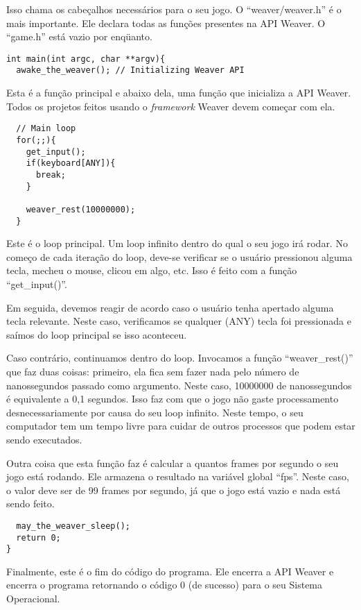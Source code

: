 \documentclass[11pt,a4paper]{book}
\begin{document}
Isso chama os cabeçalhos necessários para o seu
jogo. O ``weaver/weaver.h'' é o mais importante. Ele declara todas as
funções presentes na API Weaver. O ``game.h'' está vazio por enqüanto.  

\begin{verbatim}
int main(int argc, char **argv){
  awake_the_weaver(); // Initializing Weaver API
\end{verbatim}

Esta é a função principal e abaixo dela, uma função que inicializa a
API Weaver. Todos os projetos feitos usando o \textit{framework}
Weaver devem começar com ela.

\begin{verbatim}
  // Main loop
  for(;;){
    get_input();
    if(keyboard[ANY]){
      break;
    }

    weaver_rest(10000000);
  }
\end{verbatim}

Este é o loop principal. Um loop infinito dentro do qual o seu jogo
irá rodar. No começo de cada iteração do loop, deve-se verificar se o
usuário pressionou alguma tecla, mecheu o mouse, clicou em algo,
etc. Isso é feito com a função ``get\_input()''.

Em seguida, devemos reagir de acordo caso o usuário tenha apertado
alguma tecla relevante. Neste caso, verificamos se qualquer (ANY)
tecla foi pressionada e saímos do loop principal se isso aconteceu.

Caso contrário, continuamos dentro do loop. Invocamos a função
``wea\-ver\_rest()'' que faz duas coisas: primeiro, ela fica sem fazer
nada pelo número de nanossegundos passado como argumento. Neste caso,
10000000 de nanos\-segundos é equivalente a 0,1 segundos. Isso faz com
que o jogo não gaste processamento desnecessariamente por causa do seu
loop infinito. Neste tempo, o seu computador tem um tempo livre para
cuidar de outros processos que podem estar sendo executados.

Outra coisa que esta função faz é calcular a quantos frames por
segundo o seu jogo está rodando. Ele armazena o resultado na variável
global ``fps''. Neste caso, o valor deve ser de 99 frames por segundo,
já que o jogo está vazio e nada está sendo feito.

\begin{verbatim}
  may_the_weaver_sleep();
  return 0;
}
\end{verbatim}

Finalmente, este é o fim do código do programa. Ele encerra a API
Weaver e encerra o programa retornando o código 0 (de sucesso) para o
seu Sistema Operacional.
\end{document}
